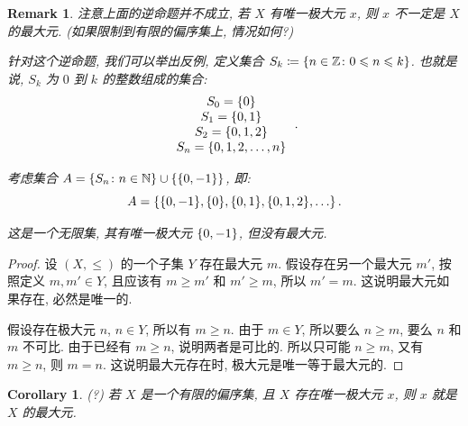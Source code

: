 \documentclass[UTF8]{ctexart}
\theoremstyle{mystyle}
\theoremstyle{myremark}
\newtheorem*{remark}{Remark}
\theoremstyle{plain}
\newtheorem{corollary}{Corollary}[section]
\newcommand{\Z}{\mathbb Z}
\newcommand{\N}{\mathbb N}
\DeclarePairedDelimiter\set{\{}{\}}
\begin{document}
\begin{remark}
    注意上面的逆命题并不成立, 若 $ X $ 有唯一极大元 $ x $, 则 $ x $ 不一定是 $ X $ 的最大元. (如果限制到有限的偏序集上, 情况如何?)

    针对这个逆命题, 我们可以举出反例, 定义集合 $ S_k \coloneqq \set{n \in \Z \colon 0 \leqslant n \leqslant k} $. 也就是说, $ S_k $ 为 $ 0 $ 到 $ k $ 的整数组成的集合:
    \[ \begin{array}{c}
        S_0 = \set{0} \\
        S_1 = \set{0, 1} \\
        S_2 = \set{0, 1, 2} \\
        S_n = \set{0, 1, 2, \dots, n}
    \end{array} \,.\]

    考虑集合 $ A = \set{S_n \colon n \in \N} \cup \set{\set{0, -1}} $, 即:
    \[ A = \set{\set{0, -1}, \set{0}, \set{0, 1}, \set{0, 1, 2}, \dots} \,.\]

    这是一个无限集, 其有唯一极大元 $ \set{0, -1} $, 但没有最大元.
\end{remark}

\begin{proof}
    设 $ (X, \le) $ 的一个子集 $ Y $ 存在最大元 $ m $. 假设存在另一个最大元 $ m' $, 按照定义 $ m, m' \in Y $, 且应该有 $ m \ge m' $ 和 $ m' \ge m $, 所以 $ m' = m $. 这说明最大元如果存在, 必然是唯一的.

    假设存在极大元 $ n $, $ n \in Y $, 所以有 $ m \ge n $.
    由于 $ m \in Y $, 所以要么 $ n \ge m $, 要么 $ n $ 和 $ m $ 不可比. 由于已经有 $ m \ge n $, 说明两者是可比的. 所以只可能 $ n \ge m $, 又有 $ m \ge n $, 则 $ m = n $. 这说明最大元存在时, 极大元是唯一等于最大元的.
\end{proof}

\begin{corollary} (?)
    若 $ X $ 是一个有限的偏序集, 且 $ X $ 存在唯一极大元 $ x $, 则 $ x $ 就是 $ X $ 的最大元.
\end{corollary}
\end{document}
